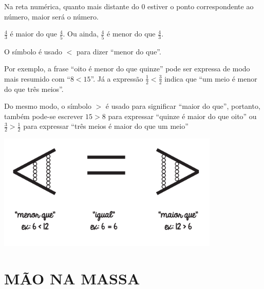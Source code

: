 Na reta numérica, quanto mais distante do 0 estiver o ponto correspondente ao número, maior será o número. 
\begin{center}
\end{center}

$\frac{4}{3}$ é maior do que $\frac{4}{5}$. Ou ainda, $\frac{4}{5}$ é menor do que $\frac{4}{3}$.


O símbolo é usado $<$ para dizer ``menor do que''.

Por exemplo, a frase ``oito é menor do que quinze'' pode ser expressa de modo mais resumido com ``$8<15$''. Já a expressão $\frac{1}{2}<\frac{3}{2}$ indica que ``um meio é menor do que três meios''.

Do mesmo modo, o símbolo $>$ é usado para significar ``maior do que'', portanto, também pode-se escrever $15>8$ para expressar ``quinze é maior do que oito'' ou $\frac{3}{2}>\frac{1}{2}$  para expressar ``três meios é maior do que um meio''
\begin{center}
  \includegraphics[width=300pt, keepaspectratio]{..//media//cap3/secoes/png/orgideias_fig05.png}   
\end{center}
  
\section{MÃO NA MASSA }

